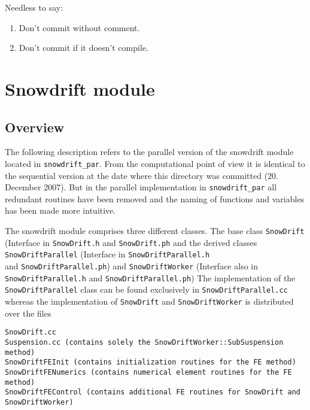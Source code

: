 \documentclass[12pt]{report}
\begin{document}
Needless to say:
\begin{enumerate}
\item Don't commit without comment.
\item Don't commit if it doesn't compile.
\end{enumerate}






\chapter{Snowdrift module}\label{ch:snowdrift}

\section{Overview}
The following description refers to the parallel version of the
snowdrift module located in \verb+snowdrift_par+. From the
computational point of view it is identical to the sequential version
at the date where this directory was committed (20. December 2007).
But in the parallel implementation in \verb+snowdrift_par+ all
redundant routines have been removed and the naming of functions and
variables has been made more intuitive.

The snowdrift module comprises three different classes. The base class
\verb+SnowDrift+ (Interface in \verb+SnowDrift.h+ and \verb+SnowDrift.ph+ and the derived classes \\
\verb+SnowDriftParallel+ (Interface in \verb+SnowDriftParallel.h+
\\and \verb+SnowDriftParallel.ph+) and \verb+SnowDriftWorker+
(Interface also in \\ \verb+SnowDriftParallel.h+ and
\verb+SnowDriftParallel.ph+) The implementation of the
\verb+SnowDriftParallel+ class can be found exclusively in
\verb+SnowDriftParallel.cc+ whereas the implementation of
\verb+SnowDrift+ and \verb+SnowDriftWorker+ is distributed over the
files
\begin{verbatim}
SnowDrift.cc 
Suspension.cc (contains solely the SnowDriftWorker::SubSuspension method)
SnowDriftFEInit (contains initialization routines for the FE method)
SnowDriftFENumerics (contains numerical element routines for the FE method)
SnowDriftFEControl (contains additional FE routines for SnowDrift and
SnowDriftWorker)
\end{verbatim}
\end{document}
